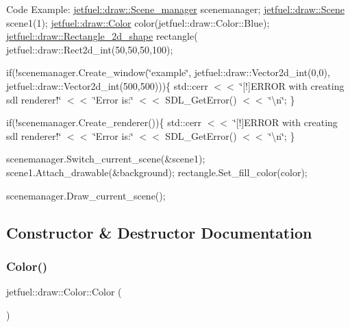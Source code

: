 Code Example\+: \hyperlink{classjetfuel_1_1draw_1_1Scene__manager}{jetfuel\+::draw\+::\+Scene\+\_\+manager} scenemanager; \hyperlink{classjetfuel_1_1draw_1_1Scene}{jetfuel\+::draw\+::\+Scene} scene1(1); \hyperlink{classjetfuel_1_1draw_1_1Color}{jetfuel\+::draw\+::\+Color} color(jetfuel\+::draw\+::\+Color\+::\+Blue); \hyperlink{classjetfuel_1_1draw_1_1Rectangle__2d__shape}{jetfuel\+::draw\+::\+Rectangle\+\_\+2d\+\_\+shape} rectangle( jetfuel\+::draw\+::\+Rect2d\+\_\+int(50,50,50,100);

if(!scenemanager.Create\+\_\+window(\char`\"{}example\char`\"{}, jetfuel\+::draw\+::\+Vector2d\+\_\+int(0,0), jetfuel\+::draw\+::\+Vector2d\+\_\+int(500,500)))\{ std\+::cerr $<$$<$ \char`\"{}\mbox{[}!\mbox{]}\+E\+R\+R\+O\+R with creating sdl renderer!\char`\"{} $<$$<$ \char`\"{}\+Error is\+:\char`\"{} $<$$<$ S\+D\+L\+\_\+\+Get\+Error() $<$$<$ \char`\"{}\textbackslash{}n\char`\"{}; \}

if(!scenemanager.Create\+\_\+renderer())\{ std\+::cerr $<$$<$ \char`\"{}\mbox{[}!\mbox{]}\+E\+R\+R\+O\+R with creating sdl renderer!\char`\"{} $<$$<$ \char`\"{}\+Error is\+:\char`\"{} $<$$<$ S\+D\+L\+\_\+\+Get\+Error() $<$$<$ \char`\"{}\textbackslash{}n\char`\"{}; \}

scenemanager.\+Switch\+\_\+current\+\_\+scene(\&scene1); scene1.\+Attach\+\_\+drawable(\&background); rectangle.\+Set\+\_\+fill\+\_\+color(color);

scenemanager.\+Draw\+\_\+current\+\_\+scene(); 

\subsection{Constructor \& Destructor Documentation}
\mbox{\label{classjetfuel_1_1draw_1_1Color_a0deb50ab0c45f96bf039d595fda8d6c3}} 
\subsubsection{\texorpdfstring{Color()}{Color()}\hspace{0.1cm}{\footnotesize\ttfamily [1/2]}}
{\footnotesize\ttfamily jetfuel\+::draw\+::\+Color\+::\+Color (\begin{DoxyParamCaption}{ }\end{DoxyParamCaption})}



